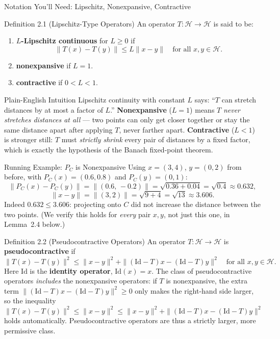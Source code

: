 \documentclass[aspectratio=169,10pt]{beamer}
\newcommand{\Id}{\mathrm{Id}}
\begin{document}
\begin{frame}[allowframebreaks]{Notation You'll Need: Lipschitz, Nonexpansive, Contractive}

  \begin{block}{Definition 2.1 (Lipschitz-Type Operators)}
    An operator $T : \mathcal{H} \to \mathcal{H}$ is said to be:
    \begin{enumerate}
      \item[(1)] \textbf{$L$-Lipschitz continuous} for $L \ge 0$ if
        \[
          \|T(x) - T(y)\| \le L\|x - y\| \quad \text{for all } x, y \in \mathcal{H}.
        \]
      \item[(2)] \textbf{nonexpansive} if $L = 1$.
      \item[(3)] \textbf{contractive} if $0 < L < 1$.
    \end{enumerate}
  \end{block}

  \begin{block}{Plain-English Intuition}
    Lipschitz continuity with constant $L$ says: ``$T$ can stretch distances
    by at most a factor of $L$.'' \textbf{Nonexpansive} ($L=1$) means $T$
    \emph{never stretches distances at all} --- two points can only get
    closer together or stay the same distance apart after applying $T$, never
    farther apart. \textbf{Contractive} ($L<1$) is stronger still: $T$ must
    \emph{strictly shrink} every pair of distances by a fixed factor, which is
    exactly the hypothesis of the Banach fixed-point theorem.
  \end{block}

  \framebreak

  \begin{exampleblock}{Running Example: $P_C$ is Nonexpansive}
    Using $x = (3,4)$, $y=(0,2)$ from before, with $P_C(x) = (0.6, 0.8)$ and
    $P_C(y) = (0, 1)$:
    \[
      \|P_C(x) - P_C(y)\| = \|(0.6,\,-0.2)\| = \sqrt{0.36 + 0.04} = \sqrt{0.4}
        \approx 0.632,
    \]
    \[
      \|x - y\| = \|(3, 2)\| = \sqrt{9+4} = \sqrt{13} \approx 3.606.
    \]
    Indeed $0.632 \le 3.606$: projecting onto $C$ did not increase the
    distance between the two points. (We verify this holds for \emph{every}
    pair $x,y$, not just this one, in Lemma~2.4 below.)
  \end{exampleblock}

  \begin{block}{Definition 2.2 (Pseudocontractive Operators)}
    An operator $T : \mathcal{H} \to \mathcal{H}$ is \textbf{pseudocontractive}
    if
    \[
      \|T(x) - T(y)\|^2 \le \|x-y\|^2 + \|(\Id - T)x - (\Id-T)y\|^2
      \quad \text{for all } x, y \in \mathcal{H}.
    \]
    Here $\Id$ is the \textbf{identity operator}, $\Id(x) = x$. The class of
    pseudocontractive operators \emph{includes} the nonexpansive operators:
    if $T$ is nonexpansive, the extra term
    $\|(\Id-T)x - (\Id-T)y\|^2 \ge 0$ only makes the right-hand side larger,
    so the inequality $\|T(x)-T(y)\|^2 \le \|x-y\|^2 \le \|x-y\|^2 +
    \|(\Id-T)x-(\Id-T)y\|^2$ holds automatically. Pseudocontractive operators
    are thus a strictly larger, more permissive class.
  \end{block}

\end{frame}
\end{document}
